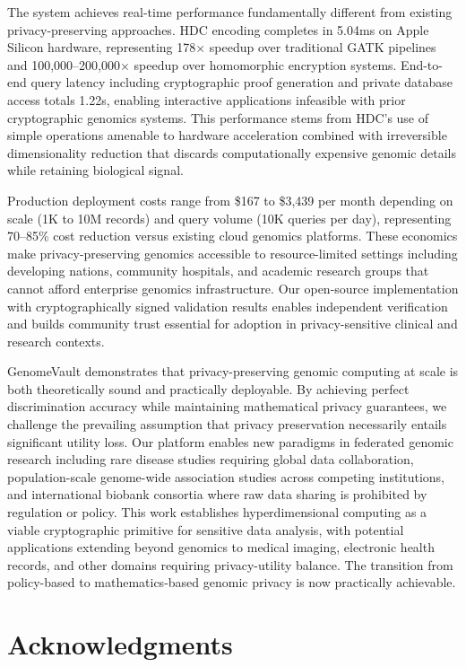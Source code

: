 \documentclass[11pt,letterpaper]{article}
\begin{document}
The system achieves real-time performance fundamentally different from existing privacy-preserving approaches. HDC encoding completes in 5.04ms on Apple Silicon hardware, representing 178$\times$ speedup over traditional GATK pipelines and 100,000--200,000$\times$ speedup over homomorphic encryption systems. End-to-end query latency including cryptographic proof generation and private database access totals 1.22s, enabling interactive applications infeasible with prior cryptographic genomics systems. This performance stems from HDC's use of simple operations amenable to hardware acceleration combined with irreversible dimensionality reduction that discards computationally expensive genomic details while retaining biological signal.

Production deployment costs range from \$167 to \$3,439 per month depending on scale (1K to 10M records) and query volume (10K queries per day), representing 70--85\% cost reduction versus existing cloud genomics platforms. These economics make privacy-preserving genomics accessible to resource-limited settings including developing nations, community hospitals, and academic research groups that cannot afford enterprise genomics infrastructure. Our open-source implementation with cryptographically signed validation results enables independent verification and builds community trust essential for adoption in privacy-sensitive clinical and research contexts.

GenomeVault demonstrates that privacy-preserving genomic computing at scale is both theoretically sound and practically deployable. By achieving perfect discrimination accuracy while maintaining mathematical privacy guarantees, we challenge the prevailing assumption that privacy preservation necessarily entails significant utility loss. Our platform enables new paradigms in federated genomic research including rare disease studies requiring global data collaboration, population-scale genome-wide association studies across competing institutions, and international biobank consortia where raw data sharing is prohibited by regulation or policy. This work establishes hyperdimensional computing as a viable cryptographic primitive for sensitive data analysis, with potential applications extending beyond genomics to medical imaging, electronic health records, and other domains requiring privacy-utility balance. The transition from policy-based to mathematics-based genomic privacy is now practically achievable.

\section*{Acknowledgments}
\end{document}
